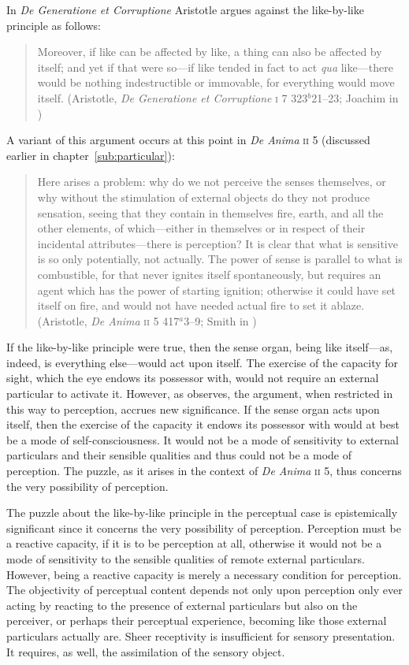 In \emph{De Generatione et Corruptione} Aristotle argues against the like-by-like principle as follows:
\begin{quote}
	Moreover, if like can be affected by like, a thing can also be affected by itself; and yet if that were so---if like tended in fact to act \emph{qua} like---there would be nothing indestructible or immovable, for everything would move itself. (Aristotle, \emph{De Generatione et Corruptione} \textsc{i} 7 323\( ^{b} \)21--23; Joachim in \citealt[23]{Barnes:1984uq})
\end{quote}
A variant of this argument occurs at this point in \emph{De Anima} \textsc{ii} 5 (discussed earlier in chapter~\ref{sub:particular}): 
\begin{quote}
	Here arises a problem: why do we not perceive the senses themselves, or why without the stimulation of external objects do they not produce sensation, seeing that they contain in themselves fire, earth, and all the other elements, of which---either in themselves or in respect of their incidental attributes---there is perception? It is clear that what is sensitive is so only potentially, not actually. The power of sense is parallel to what is combustible, for that never ignites itself spontaneously, but requires an agent which has the power of starting ignition; otherwise it could have set itself on fire, and would not have needed actual fire to set it ablaze. (Aristotle, \emph{De Anima} \textsc{ii} 5 417\( ^{a} \)3--9; Smith in \citealt[29]{Barnes:1984uq})
\end{quote}
If the like-by-like principle were true, then the sense organ, being like itself---as, indeed, is everything else---would act upon itself. The exercise of the capacity for sight, which the eye endows its possessor with, would not require an external particular to activate it. However, as \citet[226--227]{Polansky:2007ly} observes, the argument, when restricted in this way to perception, accrues new significance. If the sense organ acts upon itself, then the exercise of the capacity it endows its possessor with would at best be a mode of self-consciousness. It would not be a mode of sensitivity to external particulars and their sensible qualities and thus could not be a mode of perception. The puzzle, as it arises in the context of \emph{De Anima} \textsc{ii} 5, thus concerns the very possibility of perception.

The puzzle about the like-by-like principle in the perceptual case is epistemically significant since it concerns the very possibility of perception. Perception must be a reactive capacity, if it is to be perception at all, otherwise it would not be a mode of sensitivity to the sensible qualities of remote external particulars. However, being a reactive capacity is merely a necessary condition for perception. The objectivity of perceptual content depends not only upon perception only ever acting by reacting to the presence of external particulars but also on the perceiver, or perhaps their perceptual experience, becoming like those external particulars actually are. Sheer receptivity is insufficient for sensory presentation. It requires, as well, the assimilation of the sensory object.

